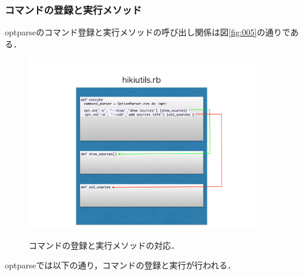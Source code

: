\subsubsection{コマンドの登録と実行メソッド}
optparseのコマンド登録と実行メソッドの呼び出し関係は図\ref{fig:005}の通りである．

\begin{figure}[htbp]\begin{center}
\includegraphics[width=10cm,bb= 0 0 737 553]{../figs/./hikiutils_yamane.005.jpg}
\caption{コマンドの登録と実行メソッドの対応．}
\label{fig:005}
\label{default}\end{center}\end{figure}
optparseでは以下の通り，コマンドの登録と実行が行われる．

